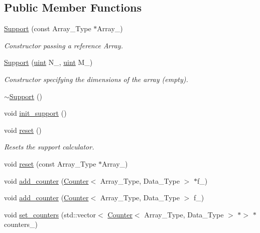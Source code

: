 \subsection*{Public Member Functions}
\begin{DoxyCompactItemize}
\item 
\hyperlink{classbarry_1_1_support_ab946f83af83c571de8bd5a17ce453240}{Support} (const Array\+\_\+\+Type $\ast$Array\+\_\+)
\begin{DoxyCompactList}\small\item\em Constructor passing a reference Array. \end{DoxyCompactList}\item 
\hyperlink{classbarry_1_1_support_aa451bd21c09935b686869fef96c5b874}{Support} (\hyperlink{namespacebarry_a11dfc53ddb4672278319aa04f1e09a6c}{uint} N\+\_\+, \hyperlink{namespacebarry_a11dfc53ddb4672278319aa04f1e09a6c}{uint} M\+\_\+)
\begin{DoxyCompactList}\small\item\em Constructor specifying the dimensions of the array (empty). \end{DoxyCompactList}\item 
\hyperlink{classbarry_1_1_support_a1ffd5ee63fa68338cbbf443e1e54e5b4}{$\sim$\+Support} ()
\item 
void \hyperlink{classbarry_1_1_support_aef6fda6e7a0989f53fcd252609d770c9}{init\+\_\+support} ()
\item 
void \hyperlink{classbarry_1_1_support_a5878ac60282fc1380c92f3ba502f249e}{reset} ()
\begin{DoxyCompactList}\small\item\em Resets the support calculator. \end{DoxyCompactList}\item 
void \hyperlink{classbarry_1_1_support_afbe207cc2762bc698c9ccb3212e9de78}{reset} (const Array\+\_\+\+Type $\ast$Array\+\_\+)
\item 
void \hyperlink{classbarry_1_1_support_a0ad8bb6202451253697d771a28859210}{add\+\_\+counter} (\hyperlink{classbarry_1_1_counter}{Counter}$<$ Array\+\_\+\+Type, Data\+\_\+\+Type $>$ $\ast$f\+\_\+)
\item 
void \hyperlink{classbarry_1_1_support_aa8680937a0237286a8b0401bca07cbf6}{add\+\_\+counter} (\hyperlink{classbarry_1_1_counter}{Counter}$<$ Array\+\_\+\+Type, Data\+\_\+\+Type $>$ f\+\_\+)
\item 
void \hyperlink{classbarry_1_1_support_a07f225ee54158980ededaccc47abad4c}{set\+\_\+counters} (std\+::vector$<$ \hyperlink{classbarry_1_1_counter}{Counter}$<$ Array\+\_\+\+Type, Data\+\_\+\+Type $>$ $\ast$$>$ $\ast$counters\+\_\+)
$$
\end{DoxyCompactItemize}

